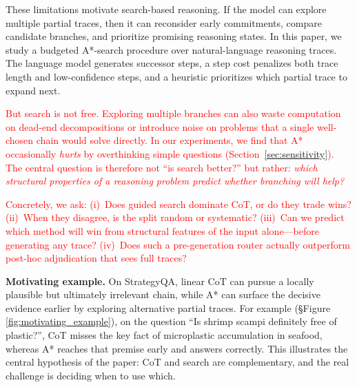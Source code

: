 \documentclass[11pt]{article}
\begin{document}
These limitations motivate search-based reasoning. If the model can explore multiple partial traces, then it can reconsider early commitments, compare candidate branches, and prioritize promising reasoning states. In this paper, we study a budgeted A*-search procedure over natural-language reasoning traces. The language model generates successor steps, a step cost penalizes both trace length and low-confidence steps, and a heuristic prioritizes which partial trace to expand next.

\textcolor{red}{But search is not free. Exploring multiple branches can also waste computation on dead-end decompositions or introduce noise on problems that a single well-chosen chain would solve directly. In our experiments, we find that A* occasionally \emph{hurts} by overthinking simple questions (Section~\ref{sec:sensitivity}). The central question is therefore not ``is search better?'' but rather: \emph{which structural properties of a reasoning problem predict whether branching will help?}}

\textcolor{red}{Concretely, we ask: (i)~Does guided search dominate CoT, or do they trade wins? (ii)~When they disagree, is the split random or systematic? (iii)~Can we predict which method will win from structural features of the input alone---before generating any trace? (iv)~Does such a pre-generation router actually outperform post-hoc adjudication that sees full traces?}





\textbf{Motivating example.} On StrategyQA, linear CoT can pursue a locally plausible but ultimately irrelevant chain, while A* can surface the decisive evidence earlier by exploring alternative partial traces. For example (\S Figure \ref{fig:motivating_example}), on the question ``Is shrimp scampi definitely free of plastic?'', CoT misses the key fact of microplastic accumulation in seafood, whereas A* reaches that premise early and answers correctly. This illustrates the central hypothesis of the paper: CoT and search are complementary, and the real challenge is deciding when to use which.
\end{document}
